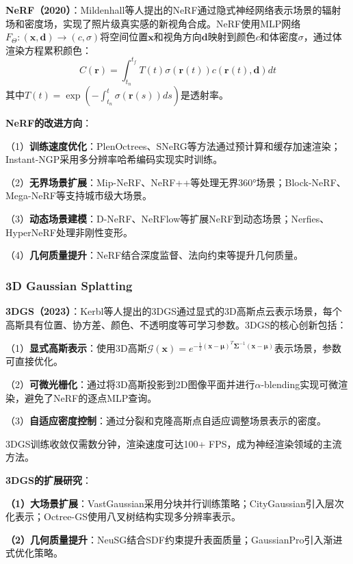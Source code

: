 \documentclass[12pt,a4paper]{ctexbook}
\newcommand{\vect}[1]{\boldsymbol{#1}}
\newcommand{\mat}[1]{\mathbf{#1}}
\begin{document}
\textbf{NeRF（2020）}：Mildenhall等人提出的NeRF通过隐式神经网络表示场景的辐射场和密度场，实现了照片级真实感的新视角合成。NeRF使用MLP网络$F_\Theta: (\vect{x}, \vect{d}) \rightarrow (c, \sigma)$将空间位置$\vect{x}$和视角方向$\vect{d}$映射到颜色$c$和体密度$\sigma$，通过体渲染方程累积颜色：
\begin{equation}
    C(\vect{r}) = \int_{t_n}^{t_f} T(t)\sigma(\vect{r}(t))c(\vect{r}(t), \vect{d})dt
\end{equation}
其中$T(t) = \exp\left(-\int_{t_n}^{t}\sigma(\vect{r}(s))ds\right)$是透射率。

\textbf{NeRF的改进方向}：

（1）\textbf{训练速度优化}：PlenOctrees、SNeRG等方法通过预计算和缓存加速渲染；Instant-NGP采用多分辨率哈希编码实现实时训练。

（2）\textbf{无界场景扩展}：Mip-NeRF、NeRF++等处理无界360°场景；Block-NeRF、Mega-NeRF等支持城市级大场景。

（3）\textbf{动态场景建模}：D-NeRF、NeRFlow等扩展NeRF到动态场景；Nerfies、HyperNeRF处理非刚性变形。

（4）\textbf{几何质量提升}：NeRF结合深度监督、法向约束等提升几何质量。

\subsubsection{3D Gaussian Splatting}

\textbf{3DGS（2023）}：Kerbl等人提出的3DGS通过显式的3D高斯点云表示场景，每个高斯具有位置、协方差、颜色、不透明度等可学习参数。3DGS的核心创新包括：

（1）\textbf{显式高斯表示}：使用3D高斯$\mathcal{G}(\vect{x}) = e^{-\frac{1}{2}(\vect{x}-\vect{\mu})^T\mat{\Sigma}^{-1}(\vect{x}-\vect{\mu})}$表示场景，参数可直接优化。

（2）\textbf{可微光栅化}：通过将3D高斯投影到2D图像平面并进行$\alpha$-blending实现可微渲染，避免了NeRF的逐点MLP查询。

（3）\textbf{自适应密度控制}：通过分裂和克隆高斯点自适应调整场景表示的密度。

3DGS训练收敛仅需数分钟，渲染速度可达100+ FPS，成为神经渲染领域的主流方法。

\textbf{3DGS的扩展研究}：

\textbf{（1）大场景扩展}：VastGaussian采用分块并行训练策略；CityGaussian引入层次化表示；Octree-GS使用八叉树结构实现多分辨率表示。

\textbf{（2）几何质量提升}：NeuSG结合SDF约束提升表面质量；GaussianPro引入渐进式优化策略。
\end{document}
